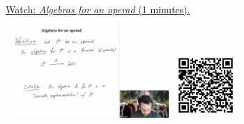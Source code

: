 
\begin{minipage}{10cm}
    \href{https://act4e-spring21.netlify.app/videos/spring2021-operads-b:operad-algebras.html}{Watch: \emph{Algebras for an operad} (1 minutes).}
        
    \href{https://act4e-spring21.netlify.app/videos/spring2021-operads-b:operad-algebras.html}{\includegraphics[height=3.5cm]{spring2021-operads-b:operad-algebras/thumbnails.jpg}}
    \href{https://act4e-spring21.netlify.app/videos/spring2021-operads-b:operad-algebras.html}{\includegraphics[height=2.5cm]{spring2021-operads-b:operad-algebras/qrcode.png}}
\end{minipage}
